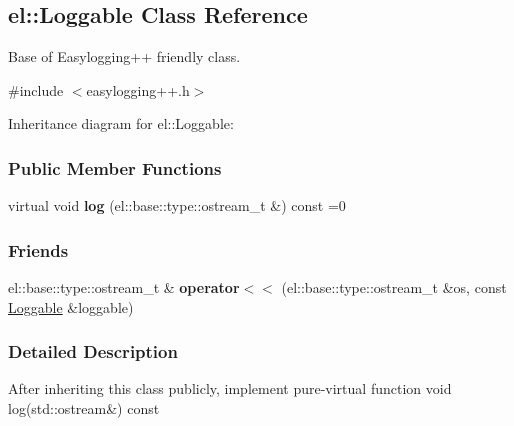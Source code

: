 \hypertarget{a00047}{}\subsection{el\+:\+:Loggable Class Reference}
\label{a00047}


Base of Easylogging++ friendly class.  




{\ttfamily \#include $<$easylogging++.\+h$>$}



Inheritance diagram for el\+:\+:Loggable\+:
\subsubsection*{Public Member Functions}
\begin{DoxyCompactItemize}
\item 
\hypertarget{a00047_ad8a2e0ebc11e4bd00ef49fc67db3d59e}{}virtual void {\bfseries log} (el\+::base\+::type\+::ostream\+\_\+t \&) const =0\label{a00047_ad8a2e0ebc11e4bd00ef49fc67db3d59e}

\end{DoxyCompactItemize}
\subsubsection*{Friends}
\begin{DoxyCompactItemize}
\item 
\hypertarget{a00047_a00722a386f498be3ebece2e266fb0f05}{}el\+::base\+::type\+::ostream\+\_\+t \& {\bfseries operator$<$$<$} (el\+::base\+::type\+::ostream\+\_\+t \&os, const \hyperlink{a00047}{Loggable} \&loggable)\label{a00047_a00722a386f498be3ebece2e266fb0f05}

\end{DoxyCompactItemize}


\subsubsection{Detailed Description}
After inheriting this class publicly, implement pure-\/virtual function {\ttfamily void log(std\+::ostream\&) const} 